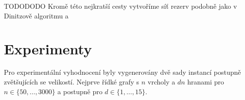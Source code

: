\documentclass{article}
\theoremstyle{plain}
\theoremstyle{definition}
\begin{document}
TODODODO
Kromě této nejkratší cesty vytvoříme síť rezerv podobně jako v Dinitzově algoritmu a 


\section{Experimenty}
Pro experimentální vyhodnocení byly vygenerovány dvě sady instancí postupně zvětšujících se velikostí. Nejprve řídké grafy s $n$ vrcholy a $dn$ hranami pro $n\in\{50,\ldots,3000\}$ a postupně pro $d\in\{1,\ldots,15\}$.



\end{document}
